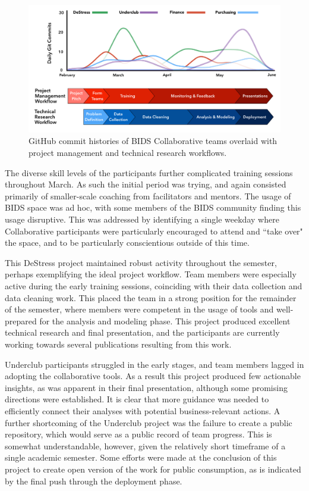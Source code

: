 \documentclass[12pt]{article}
\begin{document}
\begin{figure}
\centerline{\includegraphics[scale=0.435]{BIDS_Collaborative_Workflow_NEW.png}}
\caption{GitHub commit histories of BIDS Collaborative teams overlaid with project management and technical research workflows.}
\label{fig:gitcommits}
\end{figure}

The diverse skill levels of the participants further complicated training sessions throughout March. As such the initial period was trying, and again consisted primarily of smaller-scale coaching from facilitators and mentors. The usage of BIDS space was ad hoc, with some members of the BIDS community finding this usage disruptive. This was addressed by identifying a single weekday where Collaborative participants were particularly encouraged to attend and ``take over" the space, and to be particularly conscientious outside of this time.

This DeStress project maintained robust activity throughout the semester, perhaps exemplifying the ideal project workflow.  Team members were especially active during the early training sessions, coinciding with their data collection and data cleaning work.  This placed the team in a strong position for the remainder of the semester, where members were competent in the usage of tools and well-prepared for the analysis and modeling phase.  This project produced excellent technical research and final presentation, and the participants are currently working towards several publications resulting from this work.

Underclub participants struggled in the early stages, and team members lagged in adopting the collaborative tools.  As a result this project produced few actionable insights, as was apparent in their final presentation, although some promising directions were established. It is clear that more guidance was needed to efficiently connect their analyses with potential business-relevant actions.  A further shortcoming of the Underclub project was the failure to create a public repository, which would serve as a public record of team progress. This is somewhat understandable, however, given the relatively short timeframe of a single academic semester.  Some efforts were made at the conclusion of this project to create open version of the work for public consumption, as is indicated by the final push through the deployment phase.
\end{document}
